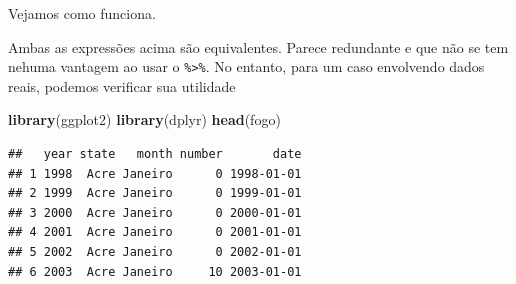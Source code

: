 \documentclass[
]{book}
\newenvironment{Shaded}{\begin{snugshade}}{\end{snugshade}}
\newcommand{\DataTypeTok}[1]{\textcolor[rgb]{0.13,0.29,0.53}{#1}}
\newcommand{\KeywordTok}[1]{\textcolor[rgb]{0.13,0.29,0.53}{\textbf{#1}}}
\newcommand{\NormalTok}[1]{#1}
\newcommand{\OperatorTok}[1]{\textcolor[rgb]{0.81,0.36,0.00}{\textbf{#1}}}
\newcommand{\StringTok}[1]{\textcolor[rgb]{0.31,0.60,0.02}{#1}}
\theoremstyle{definition}
\theoremstyle{definition}
\theoremstyle{definition}
\theoremstyle{remark}
\begin{document}
Vejamos como funciona.

\begin{Shaded}
\end{Shaded}

Ambas as expressões acima são equivalentes. Parece redundante e que não se tem nehuma vantagem ao usar o \texttt{\%\textgreater{}\%}. No entanto, para um caso envolvendo dados reais, podemos verificar sua utilidade

\begin{Shaded}
\begin{Highlighting}[]
\KeywordTok{library}\NormalTok{(ggplot2)}
\KeywordTok{library}\NormalTok{(dplyr)}
\KeywordTok{head}\NormalTok{(fogo)}
\end{Highlighting}
\end{Shaded}

\begin{verbatim}
##   year state   month number       date
## 1 1998  Acre Janeiro      0 1998-01-01
## 2 1999  Acre Janeiro      0 1999-01-01
## 3 2000  Acre Janeiro      0 2000-01-01
## 4 2001  Acre Janeiro      0 2001-01-01
## 5 2002  Acre Janeiro      0 2002-01-01
## 6 2003  Acre Janeiro     10 2003-01-01
\end{verbatim}

\begin{Shaded}
\end{Shaded}
\end{document}
